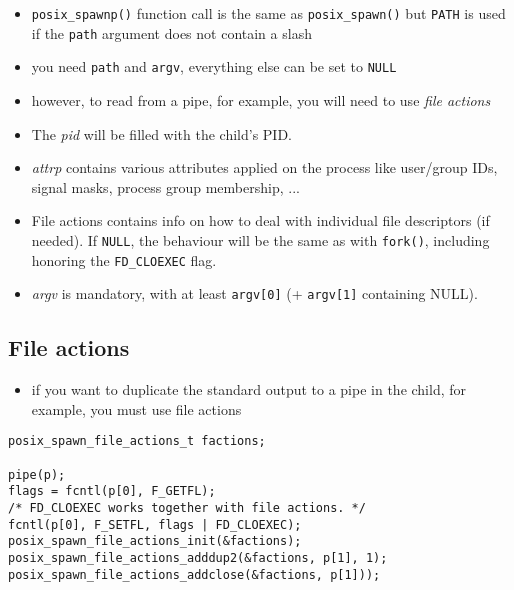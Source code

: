 \begin{itemize}
\item \texttt{posix\_spawnp()} function call is the same as
\texttt{posix\_spawn()} but \texttt{PATH} is used if the \texttt{path} argument
does not contain a slash
\item you need \texttt{path} and \texttt{argv}, everything else can be set to
\texttt{NULL}
\item however, to read from a pipe, for example, you will need to use \emph{file
actions}
\end{itemize}

\begin{itemize}
\item The \emph{pid} will be filled with the child's PID.
\item \emph{attrp} contains various attributes applied on the process like
user/group IDs, signal masks, process group membership, ...
\item File actions contains info on how to deal with individual file descriptors
(if needed). If \texttt{NULL}, the behaviour will be the same as with
\texttt{fork()}, including honoring the \texttt{FD\_CLOEXEC} flag.
\item \emph{argv} is mandatory, with at least \texttt{argv[0]} (+
\texttt{argv[1]} containing NULL).
\end{itemize}

\subsection{File actions}

\begin{itemize}
\item if you want to duplicate the standard output to a pipe in the child, for
example, you must use file actions
\end{itemize}

\begin{lstlisting}
posix_spawn_file_actions_t factions;

pipe(p);
flags = fcntl(p[0], F_GETFL);
/* FD_CLOEXEC works together with file actions. */
fcntl(p[0], F_SETFL, flags | FD_CLOEXEC);
posix_spawn_file_actions_init(&factions);
posix_spawn_file_actions_adddup2(&factions, p[1], 1);
posix_spawn_file_actions_addclose(&factions, p[1]));
\end{lstlisting}


